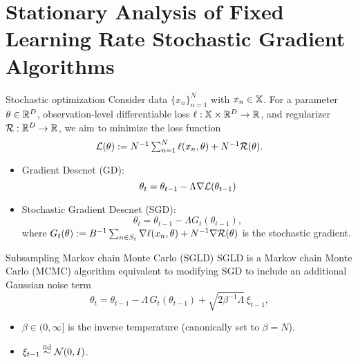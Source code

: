 \documentclass[10pt,xcolor=table]{beamer}
\begin{document}
\section{Stationary Analysis of Fixed Learning Rate Stochastic Gradient Algorithms}
\begin{frame}{Stochastic optimization}
Consider data $\{x_{n}\}_{n=1}^{N}$ with $x_{n} \in \mathbb{X}$. 
For a parameter $\theta \in \mathbb{R}^{D}$, observation-level differentiable loss 
$\ell : \mathbb{X} \times \mathbb{R}^{D} \to \mathbb{R}$, and regularizer $\mathcal{R} : \mathbb{R}^{D} \to \mathbb{R}$, 
we aim to minimize the loss function
\begin{equation*}
\textstyle \mathcal{L}(\theta) := N^{-1} \sum_{n=1}^{N} \ell(x_{n}, \theta) + N^{-1}\mathcal{R}(\theta). 
\label{eq:loss function}
\end{equation*}\pause
\begin{itemize}
    \item Gradient Descnet (GD): $$\textstyle\theta_{t} = \theta_{t-1} - \Lambda \nabla \textstyle \mathcal{L}(\theta_{t-1})$$\pause
    \item Stochastic Gradient Descnet (SGD): 
\begin{equation*}
\textstyle\theta_{t} = \theta_{t-1} - \Lambda G_{t}(\theta_{t-1}),
\label{eq: sgd update}
\end{equation*}
where $G_{t}(\theta) := B^{-1} \sum_{n \in S_{t}} \nabla \ell(x_{n}, \theta) + N^{-1} \nabla \mathcal{R}(\theta)$ is the stochastic gradient.
\end{itemize}
\end{frame}

\begin{frame}{Subsampling Markov chain Monte Carlo (SGLD)}
SGLD is a Markov chain Monte Carlo (MCMC) algorithm equivalent to modifying SGD to include an additional Gaussian noise term
\begin{equation*}
\theta_{t} = \theta_{t-1} - \Lambda\,G_{t}(\theta_{t-1}) + \sqrt{2\beta^{-1} \Lambda}\,\xi_{t-1},
\label{eq: general SGLD update rule}
\end{equation*}
\begin{itemize}
    \item $\beta \in (0, \infty]$ is the inverse temperature (canonically set to $\beta = N$).
    \item $\xi_{t-1} \overset{\text{iid}}{\sim} \mathcal{N}(0, I)$.
\end{itemize}
\end{frame}
\end{document}
